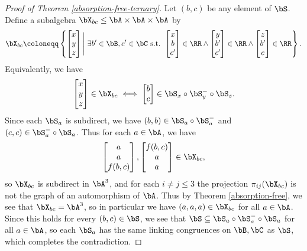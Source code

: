 \begin{proof}[Proof of Theorem \ref{absorption-free-ternary}]
Let $(b,c)$ be any element of $\bS$. Define a subalgebra $\bX_{bc} \le \bA\times \bA\times \bA$ by
\[
\bX_{bc} \coloneqq \left\{\begin{bmatrix}x\\y\\z\end{bmatrix} \Bigg|\ \exists b' \in \bB, c' \in \bC\text{ s.t. }\begin{bmatrix}x\\b\\c'\end{bmatrix} \in \RR \wedge \begin{bmatrix}y\\b'\\c'\end{bmatrix} \in \RR \wedge \begin{bmatrix}z\\b'\\c\end{bmatrix} \in \RR\right\}.
\]
Equivalently, we have
\[
\begin{bmatrix}x\\y\\z\end{bmatrix} \in \bX_{bc} \iff \begin{bmatrix}b\\c\end{bmatrix} \in \bS_x \circ \bS_y^- \circ \bS_z.
\]
Since each $\bS_a$ is subdirect, we have $(b,b) \in \bS_a\circ \bS_a^-$ and $(c,c) \in \bS_a^- \circ \bS_a$. Thus for each $a \in \bA$, we have
\[
\begin{bmatrix}a\\a\\f(b,c)\end{bmatrix}, \begin{bmatrix}f(b,c)\\a\\a\end{bmatrix} \in \bX_{bc},
\]
so $\bX_{bc}$ is subdirect in $\bA^3$, and for each $i \ne j \le 3$ the projection $\pi_{ij}(\bX_{bc})$ is not the graph of an automorphism of $\bA$. Thus by Theorem \ref{absorption-free}, we see that $\bX_{bc} = \bA^3$, so in particular we have $(a,a,a) \in \bX_{bc}$ for all $a \in \bA$. Since this holds for every $(b,c) \in \bS$, we see that $\bS \subseteq \bS_a\circ \bS_a^{-} \circ \bS_a$ for all $a \in \bA$, so each $\bS_a$ has the same linking congruences on $\bB,\bC$ as $\bS$, which completes the contradiction.
\end{proof}

